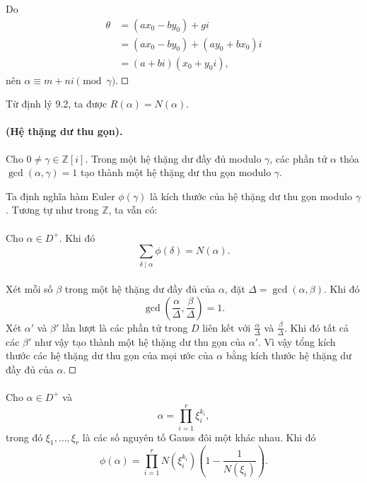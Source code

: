 \documentclass[11pt]{article}
\newcommand{\square}{\mathord{\vcenter{\hrule height .5pt
  \hbox{\vrule width .5pt height 5pt\kern5pt\vrule width .5pt}
  \hrule height .5pt}}}
\begin{document}
Do
\[
\begin{aligned}
  \theta&=(ax_0-by_0)+gi\\
  &=(ax_0-by_0)+(ay_0+bx_0)i\\
  &=(a+bi)(x_0+y_0i),
\end{aligned}
\]
nên \(\alpha\equiv m+ni\pmod\gamma\). \(\square\)

Từ định lý 9.2, ta được \(R(\alpha)=N(\alpha)\).

\paragraph{ (Hệ thặng dư thu gọn).}
Cho \(0\ne\gamma\in\mathbb Z[i]\). Trong một hệ thặng dư đầy đủ modulo
\(\gamma\), các phần tử \(\alpha\) thỏa \(\gcd(\alpha,\gamma)=1\) tạo thành
một hệ thặng dư thu gọn modulo \(\gamma\).

Ta định nghĩa hàm Euler \(\phi(\gamma)\) là kích thước của hệ thặng dư thu
gọn modulo \(\gamma\). Tương tự như trong \(\mathbb Z\), ta vẫn có:

\paragraph{}
Cho \(\alpha\in D^+\). Khi đó
\[
  \sum_{\delta\mid\alpha}\phi(\delta)=N(\alpha).
\]

\paragraph{}
Xét mỗi số \(\beta\) trong một hệ thặng dư đầy đủ của \(\alpha\), đặt
\(\Delta=\gcd(\alpha,\beta)\). Khi đó
\[
  \gcd\!\left(\frac{\alpha}{\Delta},\frac{\beta}{\Delta}\right)=1.
\]
Xét \(\alpha'\) và \(\beta'\) lần lượt là các phần tử trong \(D\) liên kết
với \(\frac{\alpha}{\Delta}\) và \(\frac{\beta}{\Delta}\). Khi đó tất cả các
\(\beta'\) như vậy tạo thành một hệ thặng dư thu gọn của \(\alpha'\). Vì vậy
tổng kích thước các hệ thặng dư thu gọn của mọi ước của \(\alpha\) bằng kích
thước hệ thặng dư đầy đủ của \(\alpha\). \(\square\)

\paragraph{}
Cho \(\alpha\in D^+\) và
\[
  \alpha=\prod_{i=1}^r \xi_i^{k_i},
\]
trong đó \(\xi_1,\ldots,\xi_r\) là các số nguyên tố Gauss đôi một khác nhau.
Khi đó
\[
  \phi(\alpha)=\prod_{i=1}^r N(\xi_i^{k_i})
    \left(1-\frac1{N(\xi_i)}\right).
\]
\end{document}
